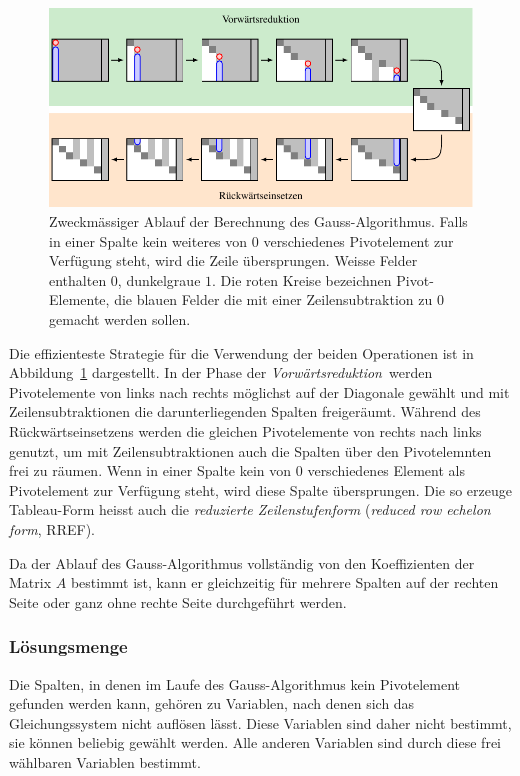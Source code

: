 \begin{figure}
\centering
\includegraphics[width=\textwidth]{chapters/10-vektorenmatrizen/images/rref.pdf}
\caption{Zweckmässiger Ablauf der Berechnung des Gauss-Algorithmus.
Falls in einer Spalte kein weiteres von $0$ verschiedenes Pivotelement
zur Verfügung steht, wird die Zeile übersprungen.
Weisse Felder enthalten $0$, dunkelgraue $1$.
Die roten Kreise bezeichnen Pivot-Elemente, die blauen Felder
die mit einer Zeilensubtraktion zu $0$ gemacht werden sollen.
\label{buch:grundlagen:fig:gaussalgorithmus}}
\end{figure}
Die effizienteste Strategie für die Verwendung der beiden Operationen
ist in Abbildung~\ref{buch:grundlagen:fig:gaussalgorithmus} dargestellt.
In der Phase der {\em Vorwärtsreduktion} werden Pivotelemente von links
nach rechts möglichst auf der Diagonale gewählt und mit Zeilensubtraktionen
die darunterliegenden Spalten freigeräumt.
%
Während des Rückwärtseinsetzens werden die gleichen Pivotelemente von 
rechts nach links genutzt, um mit Zeilensubtraktionen auch die
Spalten über den Pivotelemnten frei zu räumen.
%
Wenn in einer Spalte kein von $0$ verschiedenes Element als Pivotelement
zur Verfügung steht, wird diese Spalte übersprungen.
Die so erzeuge Tableau-Form heisst auch die {\em reduzierte Zeilenstufenform}
({\em reduced row echelon form}, RREF).
%
%

Da der Ablauf des Gauss-Algorithmus vollständig von den Koeffizienten der
Matrix $A$ bestimmt ist, kann er gleichzeitig für mehrere Spalten auf der
rechten Seite oder ganz ohne rechte Seite durchgeführt werden.

\subsubsection{Lösungsmenge}
%
Die Spalten, in denen im Laufe des Gauss-Algorithmus kein Pivotelement
gefunden werden kann, gehören zu Variablen, nach denen sich das
Gleichungssystem nicht auflösen lässt.
Diese Variablen sind daher nicht bestimmt, sie können beliebig gewählt
werden.
Alle anderen Variablen sind durch diese frei wählbaren Variablen
bestimmt.

